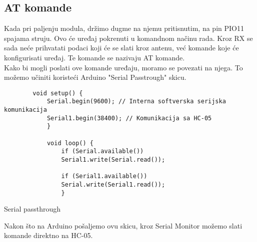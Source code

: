 \documentclass[../Document.tex]{subfiles}
\begin{document}
\subsection{AT komande}
Kada pri paljenju modula, držimo dugme na njemu pritisnutim, na pin PIO11 spajama struju. Ovo će uređaj pokrenuti u komandnom načinu rada. Kroz RX se sada neće prihvatati podaci koji će se slati kroz antenu, već komande koje će konfigurisati uređaj. Te komande se nazivaju AT komande.\\

Kako bi mogli poslati ove komande uređaju, moramo se povezati na njega. To možemo učiniti koristeći Arduino "Serial Passtrough" skicu.\\

\begin{code}
    \begin{verbatim}
        void setup() {
            Serial.begin(9600); // Interna softverska serijska komunikacija
            Serial1.begin(38400); // Komunikacija sa HC-05
            }
            
            void loop() {
                if (Serial.available())
                Serial1.write(Serial.read());
                
                if (Serial1.available())
                Serial.write(Serial1.read());
                }
            \end{verbatim}
            \caption{Serial passthrough}
        \end{code}

Nakon što na Arduino pošaljemo ovu skicu, kroz Serial Monitor možemo slati komande direktno na HC-05.
\end{document}
